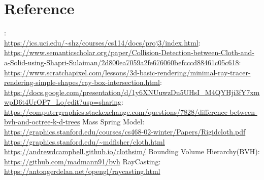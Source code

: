\documentclass{article}
\begin{document}
\section*{Reference}
\justify
[Figure 2.1.1] :\\ \url{https://ics.uci.edu/~shz/courses/cs114/docs/proj3/index.html}\newline
[Figure 2.2.2.1] :\\ \url{https://www.semanticscholar.org/paper/Collision-Detection-between-Cloth-and-a-Solid-using-Shapri-Sulaiman/2d800ea7059a2fe676060befcccd88461c05c618}\newline
[Figure 2.2.2.2] :\\ \url{https://www.scratchapixel.com/lessons/3d-basic-rendering/minimal-ray-tracer-rendering-simple-shapes/ray-box-intersection.html}\newline
[Figure 3.1] :\\ \url{https://docs.google.com/presentation/d/1y6XNUuwzDu5UHsI_M4QYHji3fY7xmwpD6t4UrOP7_Lo/edit?usp=sharing}\newline
[Figure 4.1] :\\ \url{https://computergraphics.stackexchange.com/questions/7828/difference-between-bvh-and-octree-k-d-trees}\newline\newline
Mass Spring Model:\\
\url{https://graphics.stanford.edu/courses/cs468-02-winter/Papers/Rigidcloth.pdf}\newline
\url{https://graphics.stanford.edu/~mdfisher/cloth.html}\newline
\url{https://andrewdcampbell.github.io/clothsim/}\newline\newline
Bounding Volume Hierarchy(BVH):\\
\url{https://github.com/madmann91/bvh}\newline\newline
RayCasting:\\
\url{https://antongerdelan.net/opengl/raycasting.html}\newline
\end{document}
